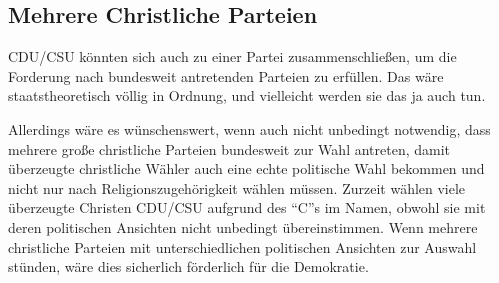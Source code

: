 \clearpage
\subsection{Mehrere Christliche Parteien}

CDU/CSU könnten sich auch zu einer Partei zusammenschließen, um die Forderung nach bundesweit
antretenden Parteien zu erfüllen. Das wäre staatstheoretisch völlig in Ordnung, und vielleicht
werden sie das ja auch tun.

Allerdings wäre es wünschenswert, wenn auch nicht unbedingt notwendig, dass mehrere große
christliche Parteien bundesweit zur Wahl antreten, damit überzeugte christliche Wähler auch eine
echte politische Wahl bekommen und nicht nur nach Religionszugehörigkeit wählen müssen. Zurzeit
wählen viele überzeugte Christen CDU/CSU aufgrund des \enquote{C}s im Namen, obwohl sie mit
deren politischen Ansichten nicht unbedingt übereinstimmen. Wenn mehrere christliche Parteien mit
unterschiedlichen politischen Ansichten zur Auswahl stünden, wäre dies sicherlich förderlich für
die Demokratie.
